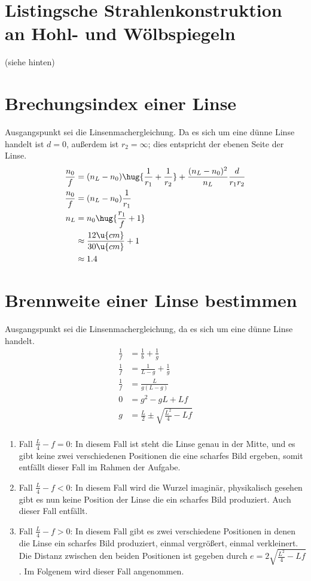 \documentclass[ex]{exercise}
\begin{document}
\section{Listingsche Strahlenkonstruktion an Hohl- und Wölbspiegeln}
\hfill(siehe hinten)\hspace*{\fill}

\section{Brechungsindex einer Linse}
Ausgangspunkt sei die Linsenmachergleichung. Da es sich um eine dünne Linse handelt
ist \(d=0\), au{\ss}erdem ist \(r_2=\infty\); dies entspricht der ebenen Seite der Linse.
\begin{align*}
    \frac {n_0}f &= (n_L - n_0)\hug{\frac 1{r_1} + \frac 1{r_2}}
    + \frac{(n_L - n_0)^2}{n_L}\frac{d}{r_1r_2}\\
    \frac {n_0}f &= (n_L - n_0)\frac 1{r_1}\\
    n_L &= n_0\hug{\frac {r_1}f + 1}\\
    &\approx \frac{12 \u{cm}}{30 \u{cm}} + 1\\
    &\approx 1.4
\end{align*}

\section{Brennweite einer Linse bestimmen}
Ausgangspunkt sei die Linsenmachergleichung, da es sich um eine dünne Linse handelt.
\begin{align*}
    \frac{1}{f} &= \frac{1}{b} + \frac{1}{g} \\  
    \frac{1}{f} &= \frac{1}{L-g} + \frac{1}{g} \\  
    \frac{1}{f} &= \frac{L}{g(L-g)} \\   
    0 &= g^2 - gL + Lf \\  
    g &= \frac{L}{2} \pm \sqrt{\frac{L^2}{4} - Lf}\\
\end{align*}

\begin{enumerate}
    \item Fall \(\frac{L}{4} - f = 0\):
    In diesem Fall ist steht die Linse genau in der Mitte, und es gibt keine zwei 
    verschiedenen Positionen die eine scharfes Bild ergeben, somit entfällt dieser Fall im Rahmen 
    der Aufgabe.\\
    
    \item Fall \(\frac{L}{4} - f < 0\):
    In diesem Fall wird die Wurzel imaginär, physikalisch gesehen gibt es nun keine
    Position der Linse die ein scharfes Bild produziert. Auch dieser Fall entfällt.

    \item Fall \(\frac{L}{4} - f > 0\):
    In diesem Fall gibt es zwei verschiedene Positionen in denen die Linse ein scharfes Bild
    produziert, einmal vergrö{\ss}ert, einmal verkleinert.
    Die Distanz zwischen den beiden Positionen ist gegeben durch \(e = 2\sqrt{\frac{L^2}{4} - Lf}\).
    Im Folgenem wird dieser Fall angenommen.
\end{enumerate}
\end{document}
